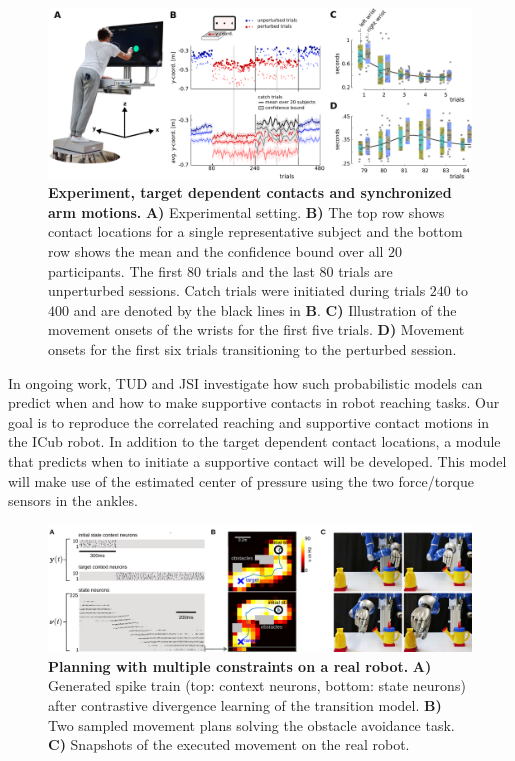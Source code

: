 \begin{figure}%
\centering
\includegraphics[width=\textwidth]{images/Figure-1(rueckert)}
 \caption[Human reaching experiment with target dependent contacts and synchronized arm motions.]{\textbf{Experiment, target dependent contacts and synchronized arm motions.} \textbf{A)} Experimental setting. 
 \textbf{B)}  The top row shows contact locations for a single representative subject 
 and the bottom row shows the mean and the confidence bound over all $20$ participants. 
 The first $80$ trials and the last $80$ trials are unperturbed sessions. 
 Catch trials were initiated during trials $240$ to $400$ and are denoted by the black lines in \textbf{B}.
 \textbf{C)} Illustration of the movement onsets of the wrists for the first five trials. 
 \textbf{D)} Movement onsets for the first six trials transitioning to the perturbed session. 
}
\label{fig:subFigContactLocationsAllSubjects}
\end{figure}

In ongoing work, TUD and JSI investigate how such probabilistic models can predict when 
and how to make supportive contacts in robot reaching tasks. Our goal is to 
reproduce the correlated reaching and supportive contact motions in the ICub robot. 
In addition to the target dependent contact locations, a module that predicts 
when to initiate a supportive contact will be developed. This model will make 
use of the estimated center of pressure using the two force/torque sensors in the 
ankles. 

\begin{figure}
\centering
\includegraphics[width=\textwidth]{images/KukaLearnedModelObstacles}
 \caption[Planning in spkining neural networks with multiple constraints on a Kuka robot.]{\textbf{Planning with multiple constraints on a real robot.} {\bf A)} Generated 
spike train (top: context neurons, bottom: state neurons) after contrastive 
divergence learning of the transition model. {\bf B)} Two sampled movement plans 
solving the obstacle avoidance task. {\bf C)} Snapshots of the executed movement 
on the real robot.
}
\label{fig:exp_kukaRueckert}
\end{figure}

